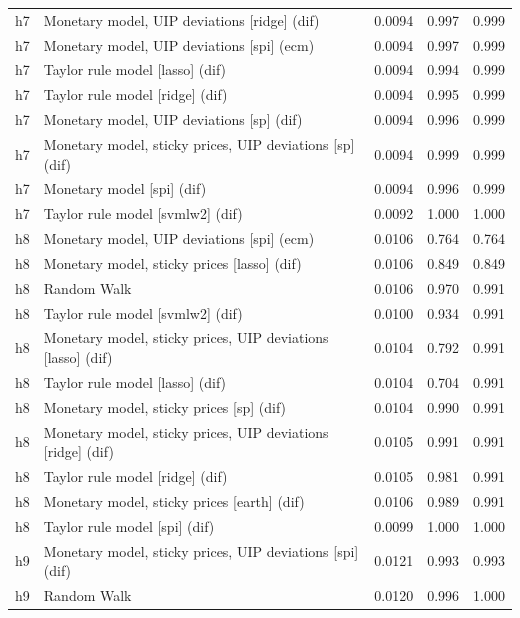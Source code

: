 \begin{ThreePartTable}
\begin{longtable}[t]{cp{5.5cm}ccc}
h7 & \raggedright Monetary model, UIP deviations [ridge] (dif) & 0.0094 & 0.997 & 0.999\\
h7 & \raggedright Monetary model, UIP deviations [spi] (ecm) & 0.0094 & 0.997 & 0.999\\
h7 & \raggedright Taylor rule model [lasso] (dif) & 0.0094 & 0.994 & 0.999\\
h7 & \raggedright Taylor rule model [ridge] (dif) & 0.0094 & 0.995 & 0.999\\
h7 & \raggedright Monetary model, UIP deviations [sp] (dif) & 0.0094 & 0.996 & 0.999\\
h7 & \raggedright Monetary model, sticky prices, UIP deviations [sp] (dif) & 0.0094 & 0.999 & 0.999\\
h7 & \raggedright Monetary model [spi] (dif) & 0.0094 & 0.996 & 0.999\\
h7 & \raggedright Taylor rule model [svmlw2] (dif) & 0.0092 & 1.000 & 1.000\\
\addlinespace
h8 & \raggedright Monetary model, UIP deviations [spi] (ecm) & 0.0106 & 0.764 & 0.764\\
h8 & \raggedright Monetary model, sticky prices [lasso] (dif) & 0.0106 & 0.849 & 0.849\\
h8 & \raggedright Random Walk & 0.0106 & 0.970 & 0.991\\
h8 & \raggedright Taylor rule model [svmlw2] (dif) & 0.0100 & 0.934 & 0.991\\
h8 & \raggedright Monetary model, sticky prices, UIP deviations [lasso] (dif) & 0.0104 & 0.792 & 0.991\\
h8 & \raggedright Taylor rule model [lasso] (dif) & 0.0104 & 0.704 & 0.991\\
h8 & \raggedright Monetary model, sticky prices [sp] (dif) & 0.0104 & 0.990 & 0.991\\
h8 & \raggedright Monetary model, sticky prices, UIP deviations [ridge] (dif) & 0.0105 & 0.991 & 0.991\\
h8 & \raggedright Taylor rule model [ridge] (dif) & 0.0105 & 0.981 & 0.991\\
h8 & \raggedright Monetary model, sticky prices [earth] (dif) & 0.0106 & 0.989 & 0.991\\
h8 & \raggedright Taylor rule model [spi] (dif) & 0.0099 & 1.000 & 1.000\\
\addlinespace
h9 & \raggedright Monetary model, sticky prices, UIP deviations [spi] (dif) & 0.0121 & 0.993 & 0.993\\
h9 & \raggedright Random Walk & 0.0120 & 0.996 & 1.000\\

\end{longtable}
\end{ThreePartTable}

